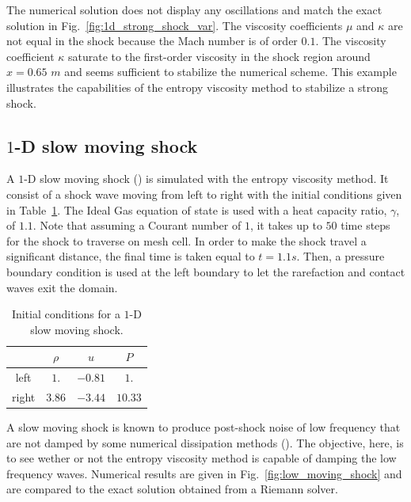 \documentclass[preprint,10pt]{elsarticle}
\newcommand{\fig}[1]{Fig.~\ref{#1}}                      %
\newcommand{\tbl}[1]{Table~\ref{#1}}                     %
\begin{document}
The numerical solution does not display any oscillations and match the exact solution in \fig{fig:1d_strong_shock_var}. The viscosity coefficients $\mu$ and $\kappa$ are not equal in the shock because the Mach number is of order $0.1$. The viscosity coefficient $\kappa$ saturate to the first-order viscosity in the shock region around $x = 0.65$ $m$ and seems sufficient to stabilize the numerical scheme. This example illustrates the capabilities of the entropy viscosity method to stabilize a strong shock. 
\subsection{$1$-D slow moving shock} \label{sec:slow_moving_shock}
A $1$-D slow moving shock (\cite{james}) is simulated with the entropy viscosity method. It consist of a shock wave moving from left to right with the initial conditions given in \tbl{tbl:ic_slow_moving}. The Ideal Gas equation of state is used with a heat capacity ratio, $\gamma$, of $1.1$. Note that assuming a Courant number of $1$, it takes up to $50$ time steps for the shock to traverse on mesh cell. In order to make the shock travel a significant distance, the final time is taken equal to $t=1.1s$. Then, a pressure boundary condition is used at the left boundary to let the rarefaction and contact waves exit the domain.   
\begin{table}[H]
\begin{center}
 \caption{\label{tbl:ic_slow_moving} Initial conditions for a $1$-D slow moving shock.}
 \begin{tabular}{|c|c|c|c|}
 \hline
   & $\rho$ & $u$ & $P$ \\
 \hline
left & $1.$ & $-0.81$ & $1.$ \\
  \hline
  right & $3.86$ & $-3.44$ & $10.33$ \\
  \hline
\end{tabular}
\end{center}
\nonumber
\end{table}
A slow moving shock is known to produce post-shock noise of low frequency that are not damped by some numerical dissipation methods (\cite{james}). The objective, here, is to see wether or not the entropy viscosity method is capable of damping the low frequency waves. Numerical results are given in \fig{fig:low_moving_shock} and are compared to the exact solution obtained from a Riemann solver. 
\end{document}
